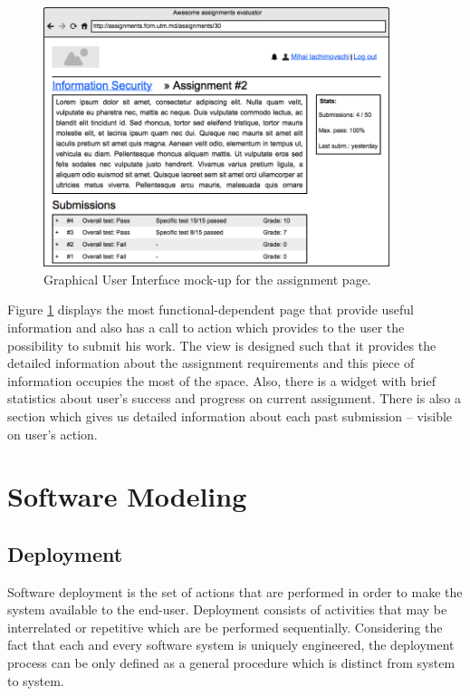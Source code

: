 \documentclass[12pt,oneside,a4paper]{article}
\begin{document}
\begin{figure}[!ht]
  \centering
    \includegraphics[width=0.9\textwidth]{pic/wireframe-assignment.png}
    \caption{Graphical User Interface mock-up for the assignment page.}
    \label{fig:mock_up_assignment}
\end{figure}

Figure \ref{fig:mock_up_assignment} displays the most functional-dependent page that provide useful information and also has a call to action which provides to the user the possibility to submit his work. The view is designed such that it provides the detailed information about the assignment requirements and this piece of information occupies the most of the space. Also, there is a widget with brief statistics about user's success and progress on current assignment. There is also a section which gives us detailed information about each past submission -- visible on user's action.

\newpage
\section{Software Modeling}
\subsection{Deployment}
Software deployment is the set of actions that are performed in order to make the system available to the end-user. Deployment consists of activities that may be interrelated or repetitive which are be performed sequentially. Considering the fact that each and every software system is uniquely engineered, the deployment process can be only defined as a general procedure which is distinct from system to system.
\end{document}
